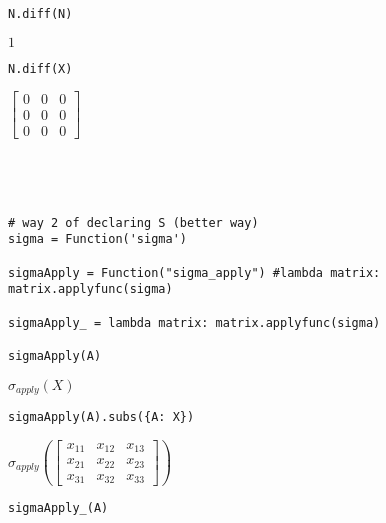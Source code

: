 \documentclass[
]{article}
\begin{document}
\begin{verbatim}

\end{verbatim}

\begin{verbatim}
N.diff(N)
\end{verbatim}

\(\displaystyle 1\)

\begin{verbatim}
N.diff(X)
\end{verbatim}

\(\displaystyle \left[\begin{matrix}0 & 0 & 0\\0 & 0 & 0\\0 & 0 & 0\end{matrix}\right]\)

\begin{verbatim}

\end{verbatim}

\begin{verbatim}



\end{verbatim}

\begin{verbatim}
# way 2 of declaring S (better way)
sigma = Function('sigma')

sigmaApply = Function("sigma_apply") #lambda matrix:  matrix.applyfunc(sigma)

sigmaApply_ = lambda matrix: matrix.applyfunc(sigma)

sigmaApply(A)
\end{verbatim}

\(\displaystyle \sigma_{apply}{\left(X \right)}\)

\begin{verbatim}
sigmaApply(A).subs({A: X})
\end{verbatim}

\(\displaystyle \sigma_{apply}{\left(\left[\begin{matrix}x_{11} & x_{12} & x_{13}\\x_{21} & x_{22} & x_{23}\\x_{31} & x_{32} & x_{33}\end{matrix}\right] \right)}\)

\begin{verbatim}
sigmaApply_(A)
\end{verbatim}
\end{document}
